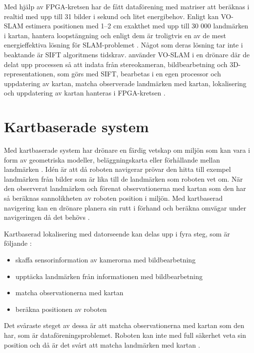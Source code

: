 Med hjälp av FPGA-kretsen har de fått dataförening med matriser att beräknas i realtid med upp till 31 bilder i sekund och litet energibehov. Enligt \cite{voslam} kan VO-SLAM estimera positionen med 1–2 cm exakthet med upp till 30 000 landmärken i kartan, hantera loopstängning och enligt dem är troligtvis en av de mest energieffektiva lösning för SLAM-problemet \citep{voslam}. Något som deras lösning tar inte i beaktande är SIFT algoritmens tidskrav. \cite{voslamlatif} använder VO-SLAM i en drönare där de delat upp processen så att indata från stereokameran, bildbearbetning och 3D-representationen, som görs med SIFT, bearbetas i en egen processor och uppdatering av kartan, matcha observerade landmärken med kartan, lokalisering och uppdatering av kartan hanteras i FPGA-kretsen \citep{voslamlatif}. 

\section{Kartbaserade system}

Med kartbaserade system har drönare en färdig vetskap om miljön som kan vara i form av geometriska modeller, beläggningskarta eller förhållande mellan landmärken \citep{982903}. Idén är att då roboten navigerar prövar den hitta till exempel landmärken från bilder som är lika till de landmärken som roboten vet om. När den observerat landmärken och förenat observationerna med kartan som den har så beräknas sannolikheten av roboten position i miljön. Med kartbaserad navigering kan en drönare planera sin rutt i förhand och beräkna omvägar under navigeringen då det behövs \citep{geospatial}. 

Kartbaserad lokalisering med datorseende kan delas upp i fyra steg, som är följande \citep{982903}:

\begin{itemize}
    \item skaffa sensorinformation av kamerorna med bildbearbetning
    \item upptäcka landmärken från informationen med bildbearbetning
    \item matcha observationerna med kartan
    \item beräkna positionen av roboten
\end{itemize}

Det svåraste steget av dessa är att matcha observationerna med kartan som den har, som är dataföreningsproblemet. Roboten kan inte med full säkerhet veta sin position och då är det svårt att matcha landmärken med kartan \citep{982903}.

